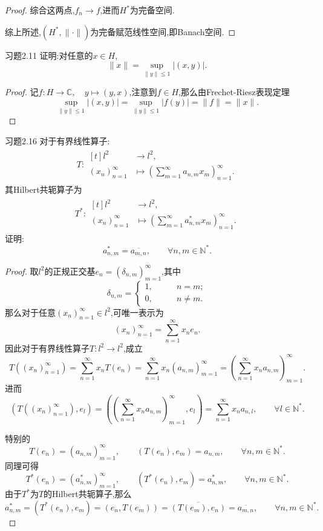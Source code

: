 \documentclass[lang = cn, scheme = chinese]{elegantbook}
\begin{document}
\begin{proof}
		综合这两点,$f_n\to f$,进而$H^*$为完备空间.
		
		综上所述,$(H^*,\|\cdot\|)$为完备赋范线性空间,即Banach空间.
	\end{proof}
	
	\begin{proposition}{习题2.11}
		证明:对任意的$x\in H$,
		$$
		\|x\|=\sup_{\|y\|\le 1}|(x,y)|.
		$$
	\end{proposition}
	
	\begin{proof}
		记$f:H\to\mathbb{C},\quad y\mapsto(y,x)$,注意到$f\in H $,那么由Frechet-Riesz表现定理
		$$
		\sup_{\|y\|\le 1}|(x,y)|=\sup_{\|y\|\le 1}|f(y)|=\|f\|=\|x\|.
		$$
	\end{proof}
	
	\begin{proposition}{习题2.16}
		对于有界线性算子:
		\begin{align*}
			T:\begin{aligned}[t]
				l^2 &\longrightarrow l^2,\\
				(x_n)_{n=1}^{\infty} &\longmapsto \left(\sum_{m=1}^{\infty}a_{n,m}x_m\right)_{n=1}^{\infty}.
			\end{aligned}
		\end{align*}
		其Hilbert共轭算子为
		\begin{align*}
			T^*:\begin{aligned}[t]
				l^2 &\longrightarrow l^2,\\
				(x_n)_{n=1}^{\infty} &\longmapsto \left(\sum_{m=1}^{\infty}a^*_{n,m}x_m\right)_{n=1}^{\infty}.
			\end{aligned}
		\end{align*}
		证明:
		$$
		a_{n,m}^*=\overline{a_{m,n}},\qquad \forall n,m\in\mathbb{N}^*.
		$$
	\end{proposition}
	
	\begin{proof}
		取$l^2$的正规正交基$e_n=(\delta_{n,m})_{m=1}^{\infty}$,其中
		$$
		\delta_{n,m}=\begin{cases}
			1,\qquad & n=m;\\
			0,\qquad & n\ne m.
		\end{cases}
		$$
		那么对于任意$( x_n )_{n=1}^{\infty}\in l^2$,可唯一表示为
		$$
		( x_n )_{n=1}^{\infty}=\sum_{n=1}^{\infty}x_ne_n.
		$$
		因此对于有界线性算子$T:l^2\to l^2$,成立
		$$
		T(( x_n )_{n=1}^{\infty})
		=\sum_{n=1}^{\infty}x_nT(e_n)
		=\sum_{n=1}^{\infty}x_n(a_{n,m})_{m=1}^{\infty}
		=\left( \sum_{n=1}^{\infty}x_na_{n,m} \right)_{m=1}^{\infty}.
		$$
		进而
		$$
		(T(( x_n )_{n=1}^{\infty}),e_l)
		=\left( \left( \sum_{n=1}^{\infty}x_na_{n,m} \right)_{m=1}^{\infty},e_l\right)
		=\sum_{n=1}^{\infty}x_na_{n,l},\qquad \forall l\in\mathbb{N}^*.
		$$
		
		特别的
		$$
		T(e_n)=(a_{n,m})_{m=1}^{\infty},\qquad (T(e_n),e_m)=a_{n,m},\qquad \forall n,m\in\mathbb{N}^*.
		$$
		同理可得
		$$
		T^*(e_n)=(a^*_{n,m})_{m=1}^{\infty},\qquad (T^*(e_n),e_m)=a_{n,m}^*,\qquad \forall n,m\in\mathbb{N}^*.
		$$
		由于$T^*$为$T$的Hilbert共轭算子,那么
		$$
		a_{n,m}^*=(T^*(e_n),e_m)=(e_n,T(e_m))=\overline{(T(e_m),e_n)}=\overline{a_{m,n}},\qquad \forall n,m\in\mathbb{N}^*.
		$$
	\end{proof}
	
\end{document}
